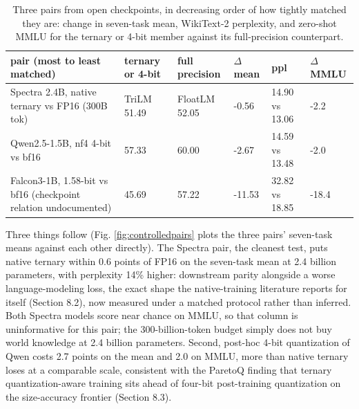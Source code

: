 \documentclass[11pt]{article}
\begin{document}
\begin{table}[htbp]\centering
\caption{Three pairs from open checkpoints, in decreasing order of how tightly matched they are: change in seven-task mean, WikiText-2 perplexity, and zero-shot MMLU for the ternary or 4-bit member against its full-precision counterpart.}
\label{tab:acc-controlled}
\footnotesize
\begin{tabularx}{\linewidth}{LLLlLl}\toprule
pair (most to least matched) & ternary or 4-bit & full precision & $\Delta$ mean & ppl & $\Delta$ MMLU \\
\midrule
Spectra 2.4B, native ternary vs FP16 (300B tok) & TriLM 51.49 & FloatLM 52.05 & -0.56 & 14.90 vs 13.06 & -2.2 \\
Qwen2.5-1.5B, nf4 4-bit vs bf16 & 57.33 & 60.00 & -2.67 & 14.59 vs 13.48 & -2.0 \\
Falcon3-1B, 1.58-bit vs bf16 (checkpoint relation undocumented) & 45.69 & 57.22 & -11.53 & 32.82 vs 18.85 & -18.4 \\
\bottomrule\end{tabularx}\end{table}

Three things follow (Fig. \ref{fig:controlledpairs} plots the three pairs' seven-task means
against each other directly). The Spectra pair, the cleanest test, puts native ternary within
0.6 points of FP16 on the seven-task mean at 2.4 billion parameters, with perplexity 14\%
higher: downstream parity alongside a worse language-modeling loss, the exact shape the
native-training literature reports for itself (Section 8.2), now measured under a matched
protocol rather than inferred. Both Spectra models score near chance on MMLU, so that
column is uninformative for this pair; the 300-billion-token budget simply does not buy
world knowledge at 2.4 billion parameters. Second, post-hoc 4-bit quantization of Qwen
costs 2.7 points on the mean and 2.0 on MMLU, more than native ternary loses at a
comparable scale, consistent with the ParetoQ finding that ternary quantization-aware
training sits ahead of four-bit post-training quantization on the size-accuracy frontier
(Section 8.3).
\end{document}
